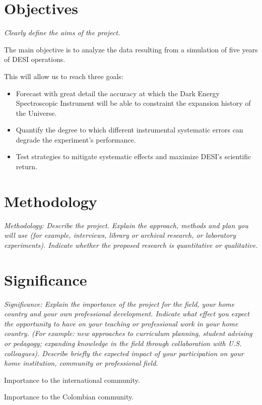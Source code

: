 \documentclass[12pt]{article}
\begin{document}
{}





\section*{Objectives}
\textit{Clearly define the aims of the project.}

The main objective is to analyze the data resulting from a simulation
of five years of DESI operations.  

This will allow us to reach three goals:
\begin{itemize}
\item Forecast with great detail the accuracy at which the Dark Energy
  Spectroscopic Instrument will be able to constraint the expansion
  history of the Universe.  
\item Quantify the degree to which different instrumental systematic
  errors can degrade the experiment's performance.
\item Test strategies to mitigate systematic effects and maximize
  DESI's scientific return.
\end{itemize}
\section*{Methodology}
\textit{Methodology: Describe the project. Explain the approach, methods and
plan you will use (for example, interviews, library or archival
research, or laboratory experiments). Indicate whether the proposed
research is quantitative or qualitative. }



\section*{Significance}
\textit{Significance: Explain the importance of the project for the field,
your home country and your own professional development. Indicate
what effect you expect the opportunity to have on your teaching or
professional work in your home country. (For example: new approaches
to curriculum planning, student advising or pedagogy; expanding
knowledge in the field through collaboration with
U.S. colleagues). Describe briefly the expected impact of your
participation on your home institution, community or professional
field. }


Importance to the international community.

Importance to the Colombian community.
\end{document}
